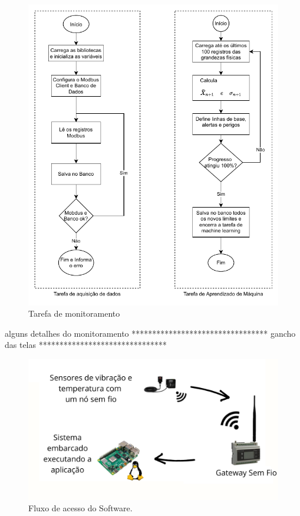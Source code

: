 \begin{figure}[H]
    \caption{Tarefa de monitoramento}
    \begin{center}
        \includegraphics[scale=1, page=2]{metodologia/img/software.pdf}
    \end{center}
    \label{fig:k-means}
\end{figure}


alguns detalhes do monitoramento *********************************
gancho das telas *******************************


\begin{figure}[H]
    \caption{Fluxo de acesso do Software.}
    \begin{center}
        \includegraphics[scale=0.25, page=2]{metodologia/img/fluxo_layout.pdf}
    \end{center}
    \label{fig:sensor_exaustor}
\end{figure}

